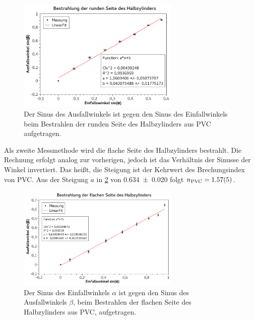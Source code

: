 \documentclass[
	a4paper,
	12pt,
	pagesize,
	ngerman
]{scrartcl}
\begin{document}
	\begin{figure}[H]
		\includegraphics[width=0.7\textwidth]{fig_rund_zyl}
		\centering
		\caption{Der Sinus des Ausfallwinkels ist gegen den Sinus des Einfallwinkels beim Bestrahlen der runden Seite des Halbzylinders aus PVC aufgetragen.}
		\label{fig_rund_zyl}
		\centering
	\end{figure}

	Als zweite Messmethode wird die flache Seite des Halbzylinders bestrahlt.
	Die Rechnung erfolgt analog zur vorherigen, jedoch ist das Verhältnis der Sinusse der Winkel invertiert.
	Das heißt, die Steigung ist der Kehrwert des Brechungsindex von PVC.
	Aus der Steigung $a$ in \cref{fig_flach_zyl} von \SI{0,634+-0,020}{} folgt $n_\text{PVC} = \SI{1,57 +- 0,05}{}$.
	\begin{figure}[H]
		\includegraphics[width=0.7\textwidth]{fig_flach_zyl}
		\centering
		\caption{Der Sinus des Einfallwinkels $\alpha$ ist gegen den Sinus des Ausfallwinkels $\beta$, beim Bestrahlen der flachen Seite des Halbzylinders aus PVC, aufgetragen.}
		\label{fig_flach_zyl}
		\centering
	\end{figure}
\end{document}
